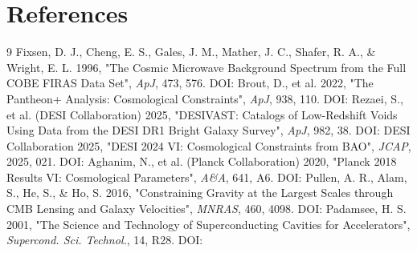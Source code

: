 \documentclass[11pt,a4paper]{article}
\begin{document}
\section{References}
{\scriptsize
\begin{thebibliography}{9}
 Fixsen, D. J., Cheng, E. S., Gales, J. M., Mather, J. C., Shafer, R. A., \& Wright, E. L. 1996, "The Cosmic Microwave Background Spectrum from the Full COBE FIRAS Data Set", \emph{ApJ}, 473, 576. DOI: \href{https://doi.org/10.1086/178173}{{\small\protect{}}}
 Brout, D., et al. 2022, "The Pantheon+ Analysis: Cosmological Constraints", \emph{ApJ}, 938, 110. DOI: \href{https://doi.org/10.3847/1538-4357/ac8e04}{{\small\protect{}}}
 Rezaei, S., et al. (DESI Collaboration) 2025, "DESIVAST: Catalogs of Low-Redshift Voids Using Data from the DESI DR1 Bright Galaxy Survey", \emph{ApJ}, 982, 38. DOI: \href{https://doi.org/10.3847/1538-4357/adb559}{{\small\protect{}}}
 DESI Collaboration 2025, "DESI 2024 VI: Cosmological Constraints from BAO", \emph{JCAP}, 2025, 021. DOI: \href{https://doi.org/10.1088/1475-7516/2025/02/021}{{\small\protect{}}}
 Aghanim, N., et al. (Planck Collaboration) 2020, "Planck 2018 Results VI: Cosmological Parameters", \emph{A\&A}, 641, A6. DOI: \href{https://doi.org/10.1051/0004-6361/201833910}{{\small\protect{}}}
 Pullen, A. R., Alam, S., He, S., \& Ho, S. 2016, "Constraining Gravity at the Largest Scales through CMB Lensing and Galaxy Velocities", \emph{MNRAS}, 460, 4098. DOI: \href{https://doi.org/10.1093/mnras/stw1249}{{\small\protect{}}}
 Padamsee, H. S. 2001, "The Science and Technology of Superconducting Cavities for Accelerators", \emph{Supercond. Sci. Technol.}, 14, R28. DOI: \href{https://doi.org/10.1088/0953-2048/14/4/202}{{\small\protect{}}}
\end{thebibliography}
}
\end{document}
